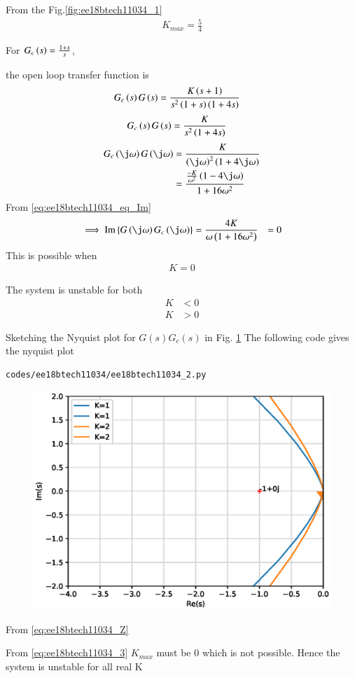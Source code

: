 From the Fig.\ref{fig:ee18btech11034_1}  
\begin{align}
 K_{max} = \frac{5}{4}  
\end{align}


\solution
For $G_{c}\left(s\right) = \frac{1+s}{s}$,

the open loop transfer function is 
\begin{align}
    G_{c}\left(s\right)G\left(s\right) &= \frac{K\left(s+1\right)}{s^2\left(1+s\right)\left(1+4s\right)}
\end{align}
\begin{align}
    G_{c}\left(s\right)G\left(s\right) &= \frac{K}{s^2\left(1+4s\right)}
\end{align}
\begin{align}
    G_{c}\brak{\j\omega}G\brak{\j\omega} &= \frac{K}{\brak{\j\omega}^2\brak{1+4\j\omega}}
    \\
    &= \frac{\frac{-K}{\omega^2}\brak{1-4\j\omega}}{1+16\omega^2}
\end{align}
From \eqref{eq:ee18btech11034_eq_Im}
\begin{align}
    \implies \text{Im} \cbrak{G\brak{\j \omega}G_{c}\brak{\j\omega}} &= \frac{4K}{{\omega}\brak{1+16\omega^2}} &= 0
\end{align}
This is possible when 
\begin{align}
    K = 0
    \label{eq:ee18btech11034_3}
\end{align}

The system is unstable for both 
\begin{align}
    K &< 0
\end{align}
\begin{align}
    K &> 0
\end{align}

 Sketching the Nyquist plot for $G(s)G_c(s)$ in Fig. \ref{fig:ee18btech11034_2}
The following code gives the nyquist plot
\begin{lstlisting}
codes/ee18btech11034/ee18btech11034_2.py
\end{lstlisting}
\begin{figure}[!h]
\centering
\includegraphics[width=\columnwidth]{./figs/ee18btech11034/ee18btech11034_2.eps}
\caption{}
\label{fig:ee18btech11034_2}
\end{figure}
From \eqref{eq:ee18btech11034_Z}

\begin{table}[!ht]
\centering

\caption{}
\label{table:ee18btech11034_table2}
\end{table}
From \eqref{eq:ee18btech11034_3} $K_{max}$ must be 0 which is not possible.
Hence the system is unstable for all real K
